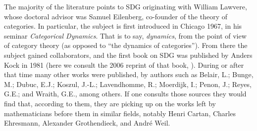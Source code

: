 The majority of the literature points to SDG originating with William Lawvere, whose doctoral advisor was Samuel Eilenberg, co-founder of the theory of categories. In particular, the subject is first introduced in Chicago 1967, in his seminar \textit{Categorical Dynamics}. That is to say, \textit{dynamics}, from the point of view of category theory (as opposed to ``the dynamics of categories''). From there the subject gained collaborators, and the first book on SDG was published by Anders Kock in 1981 (here we consult the 2006 reprint of that book, \cite{kock06}). During or after that time many other works were published, by authors such as Belair, L.; Bunge, M.; Dubuc, E.J.; Koszul, J.-L.; Lavendhomme, R.; Moerdijk, I.; Penon, J.; Reyes, G.E.; and Wraith, G.E., among others. If one consults those sources they would find that, according to them, they are picking up on the works left by mathematicians before them in similar fields, notably Henri Cartan, Charles Ehresmann, Alexander Grothendieck, and Andr\'e Weil. 

